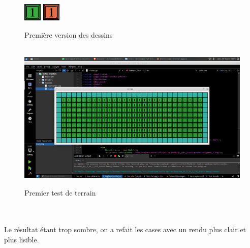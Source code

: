 \documentclass{article}
\begin{document}
\begin{figure}[!h]
\centering
\includegraphics[scale=1]{Images/green_1.jpg}
\includegraphics[scale=1]{Images/start_1.jpg}
\caption{Première version des dessins}
~\\
\includegraphics[scale=0.3]{Images/terrain.jpg}
\caption{Premier test de terrain}
\end{figure}
~\\~\\
Le résultat étant trop sombre, on a refait les cases avec un rendu plus clair et plus lisible.\\~\\~\\
\end{document}
